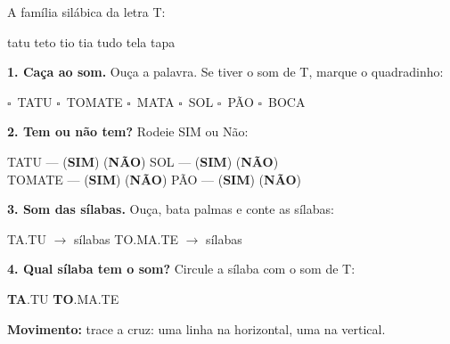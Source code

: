 
\begin{familiasilabica}
A fam\'ilia sil\'abica da letra T:

\begin{center}
tatu \quad teto \quad tio \quad tia \quad tudo \quad tela \quad tapa
\end{center}
\end{familiasilabica}


\begin{somletra}
\textbf{1. Ca\c{c}a ao som.} Ou\c{c}a a palavra. Se tiver o som de T, marque o quadradinho:
\begin{center}
$\square$~TATU \quad $\square$~TOMATE \quad $\square$~MATA \quad $\square$~SOL \quad $\square$~P\~AO \quad $\square$~BOCA
\end{center}

\textbf{2. Tem ou n\~ao{} tem?} Rodeie SIM ou N\~ao:
\begin{center}
TATU --- (\textbf{SIM}) (\textbf{N\~AO}) \quad SOL --- (\textbf{SIM}) (\textbf{N\~AO}) \\ TOMATE --- (\textbf{SIM}) (\textbf{N\~AO}) \quad P\~AO --- (\textbf{SIM}) (\textbf{N\~AO})
\end{center}
\end{somletra}

\begin{somsilaba}
\textbf{3. Som das s\'ilabas.} Ou\c{c}a, bata palmas e conte as s\'ilabas:
\begin{center}
TA.TU $\rightarrow$ \underline{\hspace{1cm}} s\'ilabas \quad TO.MA.TE $\rightarrow$ \underline{\hspace{1cm}} s\'ilabas
\end{center}

\textbf{4. Qual s\'ilaba tem o som?} Circule a s\'ilaba com o som de T:
\begin{center}
\textbf{TA}.TU \quad \textbf{TO}.MA.TE
\end{center}
\end{somsilaba}



\begin{motricidade}
\textbf{Movimento:} trace a cruz: uma linha na horizontal, uma na vertical.
\begin{center}
\end{center}
\end{motricidade}

